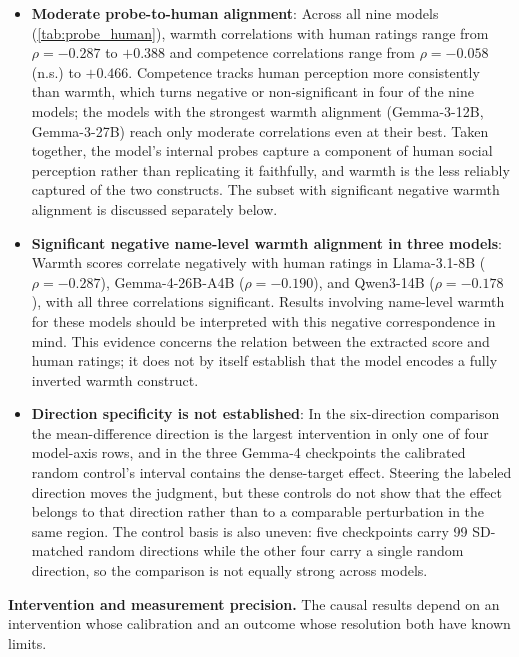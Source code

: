 \documentclass[twocolumn]{article}
\begin{document}
\begin{appendices}
\begin{itemize}[leftmargin=*, itemsep=2pt, topsep=4pt, parsep=0pt]
  \item \textbf{Moderate probe-to-human alignment}: Across all nine models
  (\autoref{tab:probe_human}), warmth correlations with human ratings range
  from $\rho = -0.287$ to $+0.388$ and competence correlations range from
  $\rho = -0.058$ (n.s.) to $+0.466$. Competence tracks human perception more
  consistently than warmth, which turns negative or non-significant in four
  of the nine models; the models with the strongest warmth alignment
  (Gemma-3-12B, Gemma-3-27B) reach only moderate correlations even at their
  best. Taken together, the model's internal probes capture a component of
  human social perception rather than replicating it faithfully, and warmth
  is the less reliably captured of the two constructs. The subset with
  significant negative warmth alignment is discussed separately below.
  \item \textbf{Significant negative name-level warmth alignment in three
  models}: Warmth scores correlate negatively with human ratings in
  Llama-3.1-8B ($\rho = -0.287$), Gemma-4-26B-A4B ($\rho = -0.190$), and
  Qwen3-14B ($\rho = -0.178$), with all three correlations significant.
  Results involving name-level warmth for these models should be interpreted
  with this negative correspondence in mind. This evidence concerns the
  relation between the extracted score and human ratings; it does not by
  itself establish that the model encodes a fully inverted warmth construct.
  \item \textbf{Direction specificity is not established}: In the
  six-direction comparison the mean-difference direction is the largest
  intervention in only one of four model-axis rows, and in the three
  Gemma-4 checkpoints the calibrated random control's interval contains the
  dense-target effect. Steering the labeled direction moves the judgment,
  but these controls do not show that the effect belongs to that direction
  rather than to a comparable perturbation in the same region. The control
  basis is also uneven: five checkpoints carry 99 SD-matched random
  directions while the other four carry a single random direction, so the
  comparison is not equally strong across models.
\end{itemize}

\smallskip\noindent\textbf{Intervention and measurement precision.}
The causal results depend on an intervention whose calibration and an
outcome whose resolution both have known limits.


\end{appendices}
\end{document}
